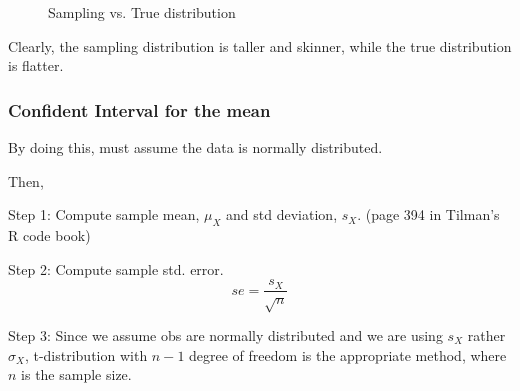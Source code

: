 \documentclass[12pt]{article}
\begin{document}
\begin{figure}[H]
\caption{Sampling vs. True distribution}
\end{figure}


Clearly, the sampling distribution is taller and skinner, while the
true distribution is flatter.





\subsubsection{Confident Interval for the mean}

By doing this, must assume the data is normally distributed.

Then,

Step 1: Compute sample mean, $ \mu_{X} $ and std deviation, $ s_{X}$. 
(page 394 in Tilman's R code book)

Step 2: Compute sample std. error. 
\begin{equation*}
		se = \frac{s_{X}}{\sqrt {n}}
\end{equation*}


Step 3: Since we assume obs are normally distributed and we are using
$ s_{X} $ rather $ \sigma_{X} $, t-distribution with $ n - 1 $ degree
of freedom is the appropriate method, where $ n $ is the sample size.
\end{document}
